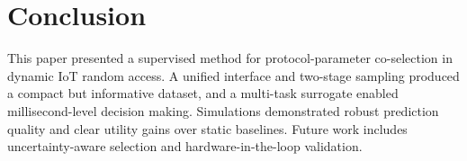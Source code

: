 \documentclass[conference]{IEEEtran}
\begin{document}
\section{Conclusion}
This paper presented a supervised method for protocol-parameter co-selection in dynamic IoT random access. A unified interface and two-stage sampling produced a compact but informative dataset, and a multi-task surrogate enabled millisecond-level decision making. Simulations demonstrated robust prediction quality and clear utility gains over static baselines. Future work includes uncertainty-aware selection and hardware-in-the-loop validation.



\end{document}
